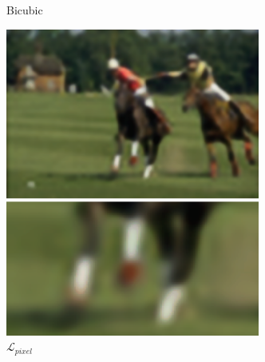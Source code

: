 \begin{figure}[t]
\begin{subfigure}[b]{0.244\textwidth}
    \caption{Bicubic}
  \end{subfigure}
  \hfill
  \begin{subfigure}[b]{0.244\textwidth}
    \includegraphics[width=\textwidth]{gfx/app-super-res-3}
    \caption{$\mathcal{L}_{pixel}$}
  \end{subfigure}
  \begin{subfigure}[b]{0.244\textwidth}

\end{subfigure}
\end{figure}
